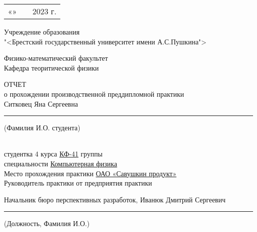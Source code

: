 \thispagestyle{empty}

\begin{FlushRight}
   \begin{tabular}{lp{2em}l} 
    «\hspace{3,5 cm}»   &&  \hspace{0.6 cm} 2023 г. \hspace{0.4 cm} \\\cline{1-1}\cline{3-3} 
    \end{tabular}
\end{FlushRight}

\vspace{20pt}
  
\begin{center}
    Учреждение образования \\
    "<Брестский государственный университет имени А.С.Пушкина"> \\
\end{center}

\begin{center}
    Физико-математический факультет \\
    Кафедра теоритической физики 
\end{center}

\begin{center}
    \MakeUppercase{отчет} \\
    о прохождении производственной преддипломной практики \\ [1\baselineskip]
    Ситковец Яна Сергеевна \\
    \hrule \hspace{0.5 cm} \footnotesize{ (Фамилия И.О. студента)} 
\end{center}
\hspace{20pt} \\
    \noindent
    студентка 4 курса \underline{КФ-41} группы \\
    специальности \underline{Компьютерная физика} \\
    Место прохождения практики \underline{ОАО «Савушкин продукт»} \\
    Руководитель практики от предприятия практики 

\begin{center}
    Начальник бюро перспективных разработок, Иванюк Дмитрий Сергеевич 
    \hrule \hspace{1 cm} \footnotesize{ (Должность, Фамилия И.О.)} 
\end{center}
\hspace{15pt}\\

